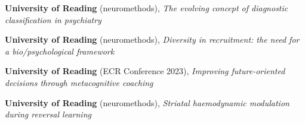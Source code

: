 	{\textbf{University of Reading} (neuromethods),
	\emph{The evolving concept of diagnostic classification in psychiatry}}

	{\textbf{University of Reading} (neuromethods),
	\emph{Diversity in recruitment: the need for a bio/psychological framework}}

	{\textbf{University of Reading} (ECR Conference 2023),
	\emph{Improving future-oriented decisions through metacognitive coaching}}

	{\textbf{University of Reading} (neuromethods),
	\emph{Striatal haemodynamic modulation during reversal learning}}
